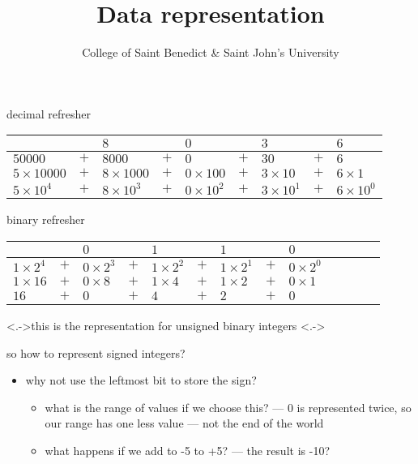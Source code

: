\documentclass[10pt,t,svgnames]{beamer}
\title{Data representation}
\date{}
\author{College of Saint Benedict \& Saint John's University}
\begin{document}
  \maketitle

  \begin{frame}{decimal refresher}
    \renewcommand{\arraystretch}{2}
    \begin{center}
      \footnotesize
      \begin{tabularx}{\textwidth}{XcXcXcXcX}
        \only<+->{$5$ && $8$ && $0$ && $3$ && $6$\\\hline
                  $50000$ & $+$ & $8000$ & $+$ & $0$ & $+$ & $30$ & $+$ & $6$}
        \only<+->{\\\hline
                  $5\times10000$ & $+$ & $8\times1000$ & $+$ & $0\times100$ & $+$ & $3\times10$ & $+$ & $6\times1$}
        \only<+->{\\\hline
                  $5\times10^4$ & $+$ & $8\times10^3$ & $+$ & $0\times10^2$ & $+$ & $3\times10^1$ & $+$ & $6\times10^0$}
      \end{tabularx}
    \end{center}
  \end{frame}

  \begin{frame}{binary refresher}
    \renewcommand{\arraystretch}{2}
    \begin{center}
      \footnotesize
      \begin{tabularx}{\textwidth}{XcXcXcXcXcXcX}
        \only<+->{$1$ && $0$ && $1$ && $1$ && $0$\\\hline
                  $1\times2^4$ & $+$ & $0\times2^3$ & $+$ & $1\times2^2$ & $+$ & $1\times2^1$ & $+$ & $0\times2^0$}
        \only<+->{\\\hline
                  $1\times16$ & $+$ & $0\times8$ & $+$ & $1\times4$ & $+$ & $1\times2$ & $+$ & $0\times1$}
        \only<+->{\\\hline
                  $16$ & $+$ & $0$ & $+$ & $4$ & $+$ & $2$ & $+$ & $0$}
      \end{tabularx}
    \end{center}

    \note[item]<.->{this is the representation for unsigned binary integers}
    \note[item]<.->{so how to represent signed integers?
      \begin{itemize}
        \item why not use the leftmost bit to store the sign?
          \begin{itemize}
            \item what is the range of values if we choose this? --- 0 is
              represented twice, so our range has one less value --- not the end
              of the world
            \item what happens if we add to -5 to +5? --- the result is -10?
          \end{itemize}
      \end{itemize}}
  \end{frame}
\end{document}
